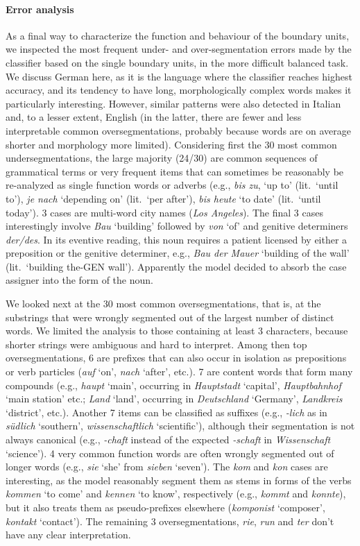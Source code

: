\paragraph{Error analysis} As a final way to characterize the function
and behaviour of the boundary units, we inspected the most frequent
under- and over-segmentation errors made by the classifier based on
the single boundary units, in the more difficult balanced task. We
discuss German here, as it is the language where the classifier
reaches highest accuracy, and its tendency to have long,
morphologically complex words makes it particularly
interesting. However, similar patterns were also detected in Italian
and, to a lesser extent, English (in the latter, there are fewer and
less interpretable common oversegmentations, probably because words
are on average shorter and morphology more limited). Considering first
the 30 most common undersegmentations, the large majority (24/30) are
common sequences of grammatical terms or very frequent items that can
sometimes be reasonably be re-analyzed as single function words or
adverbs (e.g., \emph{bis zu}, `up to' (lit.~`until to'), \emph{je
  nach} `depending on' (lit.~`per after'), \emph{bis heute} `to date'
(lit.~`until today'). 3 cases are multi-word city names (\emph{Los
  Angeles}). The final 3 cases interestingly involve \emph{Bau}
`building' followed by \emph{von} `of' and genitive determiners
\emph{der/des}. In its eventive reading, this noun requires a patient
licensed by either a preposition or the genitive determiner, e.g.,
\emph{Bau der Mauer} `building of the wall' (lit.~`building the-GEN
wall'). Apparently the model decided to absorb the case assigner into
the form of the noun.

We looked next at the 30 most common oversegmentations, that is, at the
 substrings that were wrongly segmented out of the largest
number of distinct words. We limited the analysis to those containing
at least 3 characters, because shorter strings were ambiguous and
hard to interpret. Among then top oversegmentations, 6 are prefixes that can also occur in
isolation as prepositions or verb particles (\emph{auf} `on',
\emph{nach} `after', etc.). 7 are content words that form many
compounds (e.g., \emph{haupt} `main', occurring in \emph{Hauptstadt}
`capital', \emph{Hauptbahnhof} `main station' etc.; \emph{Land}
`land', occurring in \emph{Deutschland} `Germany', \emph{Landkreis}
`district', etc.). Another 7 items can be classified as suffixes
(e.g., \emph{-lich} as in \emph{s\"udlich} `southern',
\emph{wissenschaftlich} `scientific'), although their segmentation is
not always canonical (e.g., \emph{-chaft} instead of the expected
\emph{-schaft} in \emph{Wissenschaft} `science'). 4 very common
function words are often wrongly segmented out of longer words (e.g.,
\emph{sie} `she' from \emph{sieben} `seven'). The \emph{kom} and
\emph{kon} cases are interesting, as the model
reasonably segment them as stems in forms of the verbs \emph{kommen} `to
come' and \emph{kennen} `to know', respectively (e.g., \emph{kommt}
and \emph{konnte}), but it also treats them as pseudo-prefixes elsewhere
(\emph{komponist} `composer', \emph{kontakt} `contact'). The remaining
3 oversegmentations, \emph{rie}, \emph{run} and \emph{ter} don't have
any clear interpretation.

